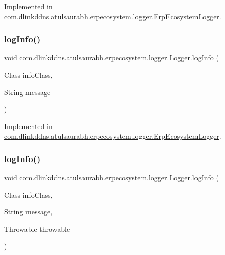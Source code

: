 Implemented in \mbox{\hyperlink{classcom_1_1dlinkddns_1_1atulsaurabh_1_1erpecosystem_1_1logger_1_1_erp_ecosystem_logger_a25071d05590b133a88f8b2f35092ebd7}{com.\+dlinkddns.\+atulsaurabh.\+erpecosystem.\+logger.\+Erp\+Ecosystem\+Logger}}.

\mbox{\label{interfacecom_1_1dlinkddns_1_1atulsaurabh_1_1erpecosystem_1_1logger_1_1_logger_a37e8723a5243a845e140d2edb6d7f701}} 
\subsubsection{\texorpdfstring{log\+Info()}{logInfo()}\hspace{0.1cm}{\footnotesize\ttfamily [2/3]}}
{\footnotesize\ttfamily void com.\+dlinkddns.\+atulsaurabh.\+erpecosystem.\+logger.\+Logger.\+log\+Info (\begin{DoxyParamCaption}\item[{Class}]{info\+Class,  }\item[{String}]{message }\end{DoxyParamCaption})}



Implemented in \mbox{\hyperlink{classcom_1_1dlinkddns_1_1atulsaurabh_1_1erpecosystem_1_1logger_1_1_erp_ecosystem_logger_a70838215b194b2f9771cec61a7f660c0}{com.\+dlinkddns.\+atulsaurabh.\+erpecosystem.\+logger.\+Erp\+Ecosystem\+Logger}}.

\mbox{\label{interfacecom_1_1dlinkddns_1_1atulsaurabh_1_1erpecosystem_1_1logger_1_1_logger_a0a674a1745e0f50d11b1f8be2c4d1726}} 
\subsubsection{\texorpdfstring{log\+Info()}{logInfo()}\hspace{0.1cm}{\footnotesize\ttfamily [3/3]}}
{\footnotesize\ttfamily void com.\+dlinkddns.\+atulsaurabh.\+erpecosystem.\+logger.\+Logger.\+log\+Info (\begin{DoxyParamCaption}\item[{Class}]{info\+Class,  }\item[{String}]{message,  }\item[{Throwable}]{throwable }\end{DoxyParamCaption})}



